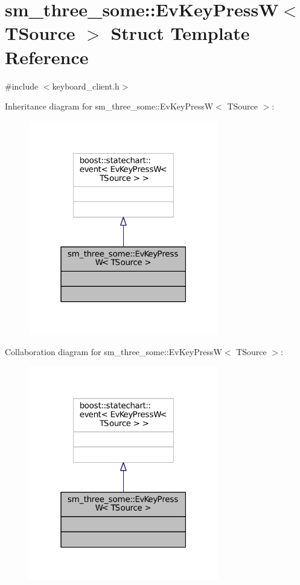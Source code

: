 \hypertarget{structsm__three__some_1_1EvKeyPressW}{}\section{sm\+\_\+three\+\_\+some\+:\+:Ev\+Key\+PressW$<$ T\+Source $>$ Struct Template Reference}
\label{structsm__three__some_1_1EvKeyPressW}


{\ttfamily \#include $<$keyboard\+\_\+client.\+h$>$}



Inheritance diagram for sm\+\_\+three\+\_\+some\+:\+:Ev\+Key\+PressW$<$ T\+Source $>$\+:
\nopagebreak
\begin{figure}[H]
\begin{center}
\leavevmode
\includegraphics[width=235pt]{structsm__three__some_1_1EvKeyPressW__inherit__graph}
\end{center}
\end{figure}


Collaboration diagram for sm\+\_\+three\+\_\+some\+:\+:Ev\+Key\+PressW$<$ T\+Source $>$\+:
\nopagebreak
\begin{figure}[H]
\begin{center}
\leavevmode
\includegraphics[width=235pt]{structsm__three__some_1_1EvKeyPressW__coll__graph}
\end{center}
\end{figure}


